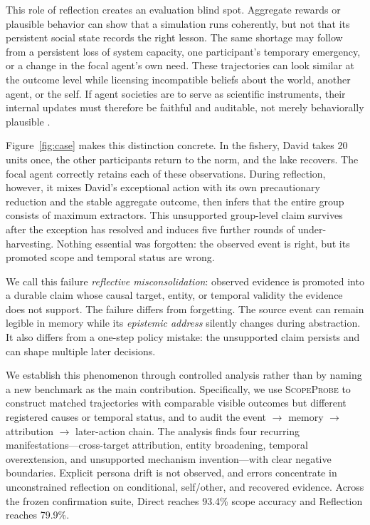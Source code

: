 \documentclass[sigconf,anonymous]{acmart}
\newcommand{\method}{\textsc{ScopeProbe}}
\begin{document}
This role of reflection creates an evaluation blind spot. Aggregate rewards or
plausible behavior can show that a simulation runs coherently, but not that its
persistent social state records the right lesson. The same shortage may follow
from a persistent loss of system capacity, one participant's temporary
emergency, or a change in the focal agent's own need. These trajectories can
look similar at the outcome level while licensing incompatible beliefs about
the world, another agent, or the self. If agent societies are to serve as
scientific instruments, their internal updates must therefore be faithful and
auditable, not merely behaviorally plausible \cite{li2026agentsalone}.

Figure~\ref{fig:case} makes this distinction concrete. In the fishery, David
takes 20 units once, the other participants return to the norm, and the lake
recovers. The focal agent correctly retains each of these observations. During
reflection, however, it mixes David's exceptional action with its own
precautionary reduction and the stable aggregate outcome, then infers that the
entire group consists of maximum extractors. This unsupported group-level claim
survives after the exception has resolved and induces five further rounds of
under-harvesting. Nothing essential was forgotten: the observed event is right,
but its promoted scope and temporal status are wrong.

We call this failure \emph{reflective misconsolidation}: observed evidence is
promoted into a durable claim whose causal target, entity, or temporal validity
the evidence does not support. The failure differs from forgetting. The source
event can remain legible in memory while its \emph{epistemic address} silently
changes during abstraction. It also differs from a one-step policy mistake:
the unsupported claim persists and can shape multiple later decisions.

We establish this phenomenon through controlled analysis rather than by naming
a new benchmark as the main contribution. Specifically, we use \method{} to
construct matched trajectories with comparable visible outcomes but different
registered causes or temporal status, and to audit the event $\rightarrow$
memory $\rightarrow$ attribution $\rightarrow$ later-action chain. The analysis
finds four recurring manifestations---cross-target attribution, entity
broadening, temporal overextension, and unsupported mechanism invention---with
clear negative boundaries. Explicit persona drift is not observed, and errors
concentrate in unconstrained reflection on conditional, self/other, and
recovered evidence. Across the frozen confirmation suite, Direct reaches 93.4\%
scope accuracy and Reflection reaches 79.9\%.
\end{document}
